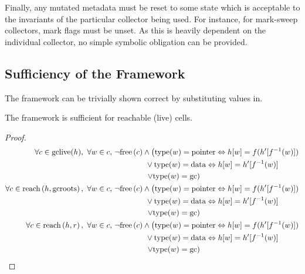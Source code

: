 Finally, any mutated metadata must be reset to some state which is
acceptable to the invariants of the particular collector being
used. For instance, for mark-sweep collectors, mark flags must be
unset. As this is heavily dependent on the individual collector, no
simple symbolic obligation can be provided.

\subsection{Sufficiency of the Framework}
\label{sec:gc-framework-sufficiency}

The framework can be trivially shown correct by substituting values
in.

\begin{lemma}
  The framework is sufficient for reachable (live) cells.
\end{lemma}

\begin{proof}
  \begin{align*}
    \forall c \in \mathrm{gclive}(h),\ \forall w \in c,\ & \lnot\free{c}
      \land \left(\mathrm{type}(w) = \mathrm{pointer} \iff h[w] =
      f(h'[f^{-1}(w)])\right.\\
    &\quad\quad\quad\quad \lor \mathrm{type}(w) = \mathrm{data}
    \iff h[w] = h'[f^{-1}(w)]\\
    &\quad\quad\quad\quad \left.\lor \mathrm{type}(w) =
      \mathrm{gc}\right)\\
%
    \forall c \in \reach{h}{\mathrm{gcroots}},\ \forall w \in c,\ &
      \lnot\free{c} \land \left(\mathrm{type}(w) = \mathrm{pointer} \iff
      h[w] = f(h'[f^{-1}(w)])\right.\\
    &\quad\quad\quad\quad \lor \mathrm{type}(w) = \mathrm{data}
      \iff h[w] = h'[f^{-1}(w)]\\
    &\quad\quad\quad\quad \left.\lor \mathrm{type}(w) =
      \mathrm{gc}\right)\\
%
    \forall c \in \reach{h}{r},\ \forall w \in c,\ & \lnot\free{c} \land
      \left(\mathrm{type}(w) = \mathrm{pointer} \iff
      h[w] = f(h'[f^{-1}(w)])\right.\\
    &\quad\quad\quad\quad \lor \mathrm{type}(w) = \mathrm{data}
      \iff h[w] = h'[f^{-1}(w)]\\
    &\quad\quad\quad\quad \left.\lor \mathrm{type}(w) =
      \mathrm{gc}\right)
\end{align*}
\end{proof}

